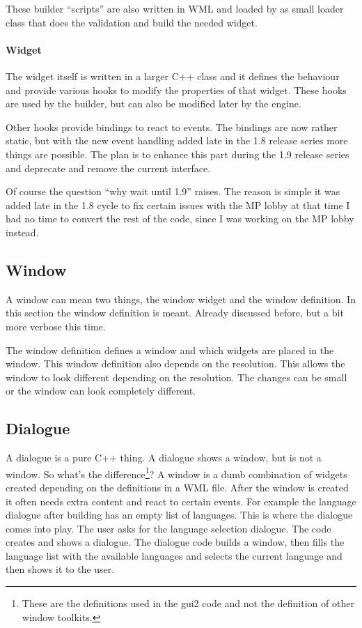\documentclass[a4paper,notitlepage,twocolumn,draft]{report}
\begin{document}
These builder ``scripts'' are also written in WML and loaded by as small loader
class that does the validation and build the needed widget.

\paragraph{Widget}
The widget itself is written in a larger C++ class and it defines the behaviour
and provide various hooks to modify the properties of that widget. These hooks
are used by the builder, but can also be modified later by the engine.

Other hooks provide bindings to react to events. The bindings are now rather
static, but with the new event handling added late in the 1.8 release series
more things are possible. The plan is to enhance this part during the 1.9
release series and deprecate and remove the current interface.

Of course the question ``why wait until 1.9'' raises. The reason is simple it
was added late in the 1.8 cycle to fix certain issues with the MP lobby at that
time I had no time to convert the rest of the code, since I was working on the
MP lobby instead.

\subsection{Window}

A window can mean two things, the window widget and the window definition. In
this section the window definition is meant. Already discussed before, but a bit
more verbose this time.

The window definition defines a window and which widgets are placed in the
window. This window definition also depends on the resolution. This allows the
window to look different depending on the resolution. The changes can be small
or the window can look completely different.

\subsection{Dialogue}

A dialogue is a pure C++ thing. A dialogue shows a window, but is not a window.
So what's the difference\footnote{These are the definitions used in the gui2
code and not the definition of other window toolkits.}? A window is a dumb
combination of widgets created depending on the definitions in a WML file. After
the window is created it often needs extra content and react to certain events.
For example the language dialogue after building has an empty list of languages.
This is where the dialogue comes into play. The user asks for the language
selection dialogue. The code creates and shows a dialogue. The dialogue code
builds a window, then fills the language list with the available languages and
selects the current language and then shows it to the user.
\end{document}
